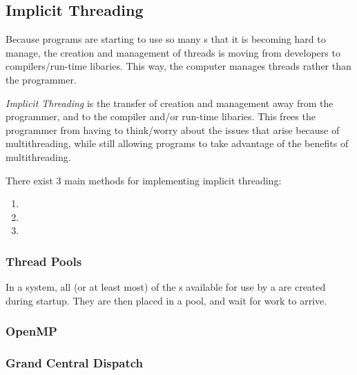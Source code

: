 \subsection{Implicit Threading}\label{subsec:Implicit_Threading}
Because programs are starting to use so many s that it is becoming hard to manage, the creation and management of threads is moving from developers to compilers/run-time libaries.
This way, the computer manages threads rather than the programmer.

\begin{definition}\label{def:Implicit_Threading}
  \emph{Implicit Threading} is the transfer of  creation and management away from the programmer, and to the compiler and/or run-time libaries.
  This frees the programmer from having to think/worry about the issues that arise because of multithreading, while still allowing programs to take advantage of the benefits of multithreading.
\end{definition}

There exist 3 main methods for implementing implicit threading:
\begin{enumerate}[noitemsep]
\item {}
\item {}
\item {}
\end{enumerate}

\subsubsection{Thread Pools}\label{subsubsec:Thread_Pools}
In a  system, all (or at least most) of the s available for use by a  are created during startup.
They are then placed in a pool, and wait for work to arrive.

\subsubsection{OpenMP}\label{subsubsec:OpenMP}
\subsubsection{Grand Central Dispatch}\label{subsubsec:Grand_Central_Dispatch}
